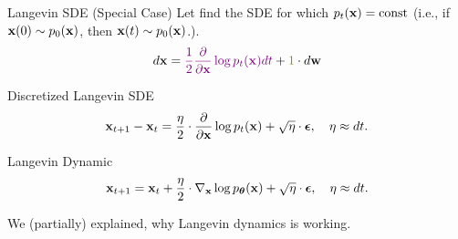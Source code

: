 \documentclass{beamer}
\begin{document}
\begin{frame}{Langevin SDE (Special Case)}
	Let find the SDE for which $p_t(\mathbf{x}) = \text{const}$ (i.e., if $\mathbf{x}(0) \sim p_0(\mathbf{x})$, then $\mathbf{x}(t) \sim p_0(\mathbf{x})$.).
	\[
		d \bx = {\color{violet}\frac{1}{2} \frac{\partial}{\partial \bx} \log p_t(\bx) d t} + {\color{olive}1} \cdot d \bw
	\]
	\eqpause
	\begin{block}{Discretized Langevin SDE}
		\vspace{-0.3cm}
		\[
			\mathbf{x}_{t + 1} - \mathbf{x}_t = \frac{\eta}{2} \cdot \frac{\partial}{\partial \mathbf{x}} \log p_t(\mathbf{x}) + \sqrt{\eta} \cdot \boldsymbol{\epsilon}, \quad \eta \approx dt.
		\]
		\vspace{-0.4cm}
	\end{block}
	\eqpause
	\begin{block}{Langevin Dynamic}
		\vspace{-0.3cm}
		\[
			\mathbf{x}_{t + 1} = \mathbf{x}_t + \frac{\eta}{2} \cdot \nabla_{\mathbf{x}} \log p_{\boldsymbol{\theta}}(\mathbf{x}) + \sqrt{\eta} \cdot \boldsymbol{\epsilon}, \quad \eta \approx dt.
		\]
		\vspace{-0.3cm}
	\end{block}
	We (partially) explained, why Langevin dynamics is working.
\end{frame}
\end{document}
